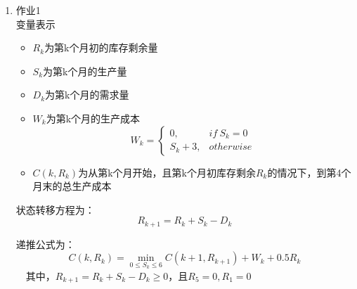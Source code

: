 \documentclass{article}
\begin{document}
	\begin{enumerate}
		\item 作业1\\
		
		变量表示
		\begin{itemize}
			\item $R_k$为第k个月初的库存剩余量
			\item $S_k$为第k个月的生产量
			\item $D_k$为第k个月的需求量
			\item $W_k$为第k个月的生产成本
				$$ W_k=\begin{cases}
				0, &if\ S_k=0\\
				S_k+3, &otherwise
				\end{cases}
				$$
			\item $C(k, R_k)$为从第k个月开始，且第k个月初库存剩余$R_k$的情况下，到第4个月末的总生产成本
		\end{itemize}

	
		状态转移方程为：
		$$R_{k+1}=R_k + S_k-D_k$$
		
		递推公式为：
		$$C(k, R_k)=\min_{0\leq S_k \leq 6}C(k+1, R_{k+1})+W_k+0.5R_k$$
		\qquad \qquad\  \ 其中，$R_{k+1}=R_k+S_k-D_k \geq 0$，且$R_5=0, R_1=0$
		

\end{enumerate}
\end{document}
